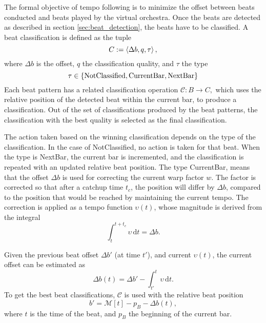 The formal objective of tempo following
is to minimize the offset between
beats conducted and
beats played by the virtual orchestra.
Once the beats are detected as described
in section \ref{sec:beat_detection},
the beats have to be classified.
A beat classification is defined as the tuple
\[
C := \left \langle \Delta b, q, \tau \right \rangle ,
\]
where $\Delta b$ is the offset,
$q$ the classification quality,
and $\tau$ the type
\[
\tau \in \left \lbrace \mathrm{NotClassified}, \mathrm{CurrentBar}, \mathrm{NextBar} \right \rbrace 
\]
Each beat pattern has a related
classification operation $ \mathcal{C} : B \rightarrow C, $
which uses the relative position of the detected beat
within the current bar,
to produce a classification.
Out of the set of classifications produced by the beat patterns,
the classification with the best quality is
selected as the final classification.

The action taken based on the winning classification
depends on the type of the classification.
In the case of NotClassified, no action is taken for that beat.
When the type is NextBar,
the current bar is incremented,
and the classification is repeated with an
updated relative beat position.
The type CurrentBar,
means that the offset $\Delta b$ is used for correcting
the current warp factor $w$.
The factor is corrected so that after a catchup time $t_c$,
the position will differ by $\Delta b$,
compared to the position
that would be reached by maintaining the current tempo.
The correction is applied as a tempo function $\upsilon (t)$,
whose magnitude is derived from the integral
\begin{equation}
\int_t^{t + t_c} \upsilon \, \mathrm{d}t = \Delta b.
\end{equation}

Given the previous beat offset $\Delta b'$ (at time $t'$),
and current $\upsilon (t)$,
the current offset can be estimated as
\begin{equation}
\Delta b(t) = \Delta b' - \int_{t'}^t \upsilon \, \mathrm{d}t.
\end{equation}
To get the best beat classifications,
$ \mathcal{C} $ is used with the relative beat position
\begin{equation}
b' = \mathcal{M} [ t ] - p_B - \Delta b(t),
\end{equation}
where $t$ is the time of the beat,
and $p_B$ the beginning of the current bar.

